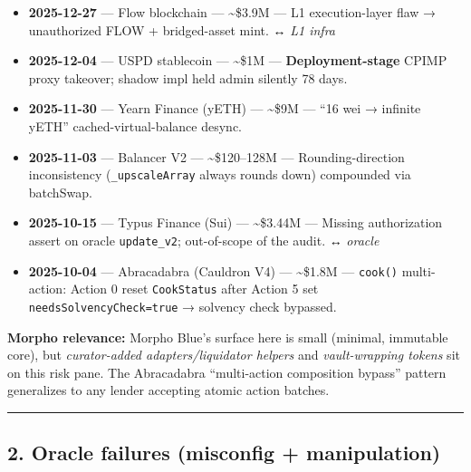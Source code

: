 \begin{itemize}
\item
  \textbf{2025-12-27} --- Flow blockchain --- \textasciitilde\$3.9M --- L1 execution-layer flaw → unauthorized FLOW + bridged-asset mint. ↔ \emph{L1 infra}
\item
  \textbf{2025-12-04} --- USPD stablecoin --- \textasciitilde\$1M --- \textbf{Deployment-stage} CPIMP proxy takeover; shadow impl held admin silently 78 days.
\item
  \textbf{2025-11-30} --- Yearn Finance (yETH) --- \textasciitilde\$9M --- ``16 wei → infinite yETH'' cached-virtual-balance desync.
\item
  \textbf{2025-11-03} --- Balancer V2 --- \textasciitilde\$120--128M --- Rounding-direction inconsistency (\texttt{\_upscaleArray} always rounds down) compounded via batchSwap.
\item
  \textbf{2025-10-15} --- Typus Finance (Sui) --- \textasciitilde\$3.44M --- Missing authorization assert on oracle \texttt{update\_v2}; out-of-scope of the audit. ↔ \emph{oracle}
\item
  \textbf{2025-10-04} --- Abracadabra (Cauldron V4) --- \textasciitilde\$1.8M --- \texttt{cook()} multi-action: Action 0 reset \texttt{CookStatus} after Action 5 set \texttt{needsSolvencyCheck=true} → solvency check bypassed.
\end{itemize}

\textbf{Morpho relevance:} Morpho Blue's surface here is small (minimal, immutable core), but \emph{curator-added adapters/liquidator helpers} and \emph{vault-wrapping tokens} sit on this risk pane. The Abracadabra ``multi-action composition bypass'' pattern generalizes to any lender accepting atomic action batches.

\begin{center}\rule{0.5\linewidth}{0.5pt}\end{center}

\subsection{2. Oracle failures (misconfig + manipulation)}\label{oracle-failures-misconfig-manipulation}


